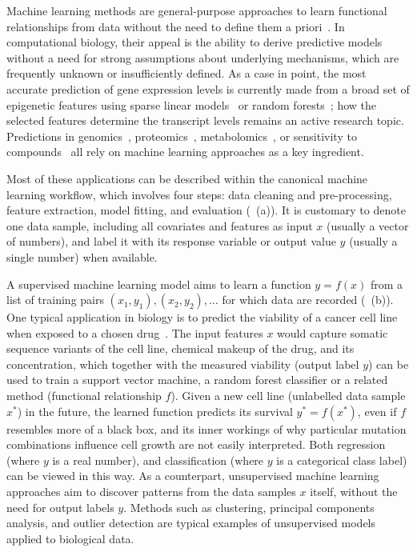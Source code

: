 Machine learning methods are general-purpose approaches to learn functional relationships from data without the need to define them a priori~\citep{hastie_elements_2005,michalski_machine_2013,murphy_machine_2012}. In computational biology, their appeal is the ability to derive predictive models without a need for strong assumptions about underlying mechanisms, which are frequently unknown or insufficiently defined. As a case in point, the most accurate prediction of gene expression levels is currently made from a broad set of epigenetic features using sparse linear models~\citep{cheng_statistical_2011,karlic_histone_2010} or random forests~\citep{li_using_2015}; how the selected features determine the transcript levels remains an active research topic. Predictions in genomics~\citep{libbrecht_machine_2015,martens_predicting_2016}, proteomics~\citep{swan_application_2013}, metabolomics~\citep{kell_metabolomics_2005}, or sensitivity to compounds~\citep{eduati_prediction_2015} all rely on machine learning approaches as a key ingredient.

Most of these applications can be described within the canonical machine learning workflow, which involves four steps: data cleaning and pre-processing, feature extraction, model fitting, and evaluation (~(a)). It is customary to denote one data sample, including all covariates and features as input $x$ (usually a vector of numbers), and label it with its response variable or output value $y$ (usually a single number) when available.

A supervised machine learning model aims to learn a function $y=f(x)$ from a list of training pairs $(x_1,y_1), (x_2,y_2),\ldots$ for which data are recorded (~(b)). One typical application in biology is to predict the viability of a cancer cell line when exposed to a chosen drug~\citep{eduati_prediction_2015,menden_machine_2013}. The input features $x$ would capture somatic sequence variants of the cell line, chemical makeup of the drug, and its concentration, which together with the measured viability (output label $y$) can be used to train a support vector machine, a random forest classifier or a related method (functional relationship $f$). Given a new cell line (unlabelled data sample $x^*$) in the future, the learned function predicts its survival $y^*=f(x^*)$, even if $f$ resembles more of a black box, and its inner workings of why particular mutation combinations influence cell growth are not easily interpreted. Both regression (where $y$ is a real number), and classification (where $y$ is a categorical class label) can be viewed in this way. As a counterpart, unsupervised machine learning approaches aim to discover patterns from the data samples $x$ itself, without the need for output labels $y$. Methods such as clustering, principal components analysis, and outlier detection are typical examples of unsupervised models applied to biological data.

